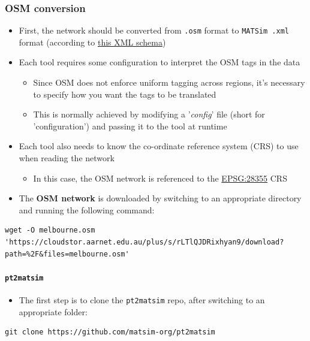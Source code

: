 \documentclass[11pt]{article}
\begin{document}
\subsubsection{OSM conversion}
\label{sec:org387c552}
\begin{itemize}
\item First, the network should be converted from \texttt{.osm} format to \texttt{MATSim .xml} format (according to \href{http://www.matsim.org/files/dtd/network\_v2.dtd}{this XML schema})
\item Each tool requires some configuration to interpret the OSM tags in the data
\begin{itemize}
\item Since OSM does not enforce uniform tagging across regions, it's necessary to specify how you want the tags to be translated
\item This is normally achieved by modifying a '\emph{config}' file (short for 'configuration') and passing it to the tool at runtime
\end{itemize}
\item Each tool also needs to know the co-ordinate reference system (CRS) to use when reading the network
\begin{itemize}
\item In this case, the OSM network is referenced to the \href{https://epsg.io/28355}{EPSG:28355} CRS
\end{itemize}
\end{itemize}

\begin{itemize}
\item The \textbf{OSM network} is downloaded by switching to an appropriate directory and running the following command:
\end{itemize}
\begin{verbatim}
wget -O melbourne.osm 'https://cloudstor.aarnet.edu.au/plus/s/rLTlQJDRixhyan9/download?path=%2F&files=melbourne.osm'
\end{verbatim}
\paragraph{\texttt{pt2matsim}}
\label{sec:org473b47a}
\begin{itemize}
\item The first step is to clone the \texttt{pt2matsim} repo, after switching to an appropriate folder:
\end{itemize}
\begin{verbatim}
git clone https://github.com/matsim-org/pt2matsim
\end{verbatim}
\end{document}
